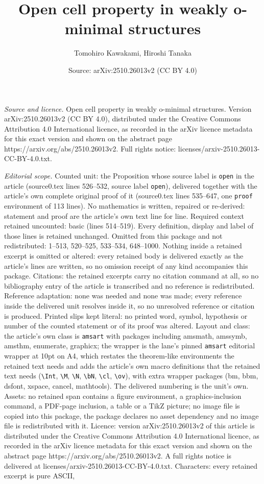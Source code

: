 \documentclass[10pt,a4paper]{amsart}
\title[Open cell property in weakly o-minimal structures]{Open cell property in weakly o-minimal structures}
\author{Tomohiro Kawakami, Hiroshi Tanaka}
\date{Source: arXiv:2510.26013v2 (CC BY 4.0)}
\begin{document}
\maketitle

\noindent\emph{Source and licence.} Open cell property in weakly o-minimal structures. Version arXiv:2510.26013v2 (CC BY 4.0), distributed under the Creative Commons Attribution 4.0 International licence, as recorded in the arXiv licence metadata for this exact version and shown on the abstract page https://arxiv.org/abs/2510.26013v2. Full rights notice: licenses/arxiv-2510.26013-CC-BY-4.0.txt.\par\smallskip

\noindent\textit{Editorial scope.} Counted unit: the Proposition whose source label is \texttt{open} in the article (source0.tex lines 526--532, source label \texttt{open}), delivered together with the article's own complete original proof of it (source0.tex lines 535--647, one \texttt{proof} environment of 113 lines). No mathematics is written, repaired or re-derived: statement and proof are the article's own text line for line. Required context retained uncounted: basic (lines 514--519). Every definition, display and label of those lines is retained unchanged. Omitted from this package and not redistributed: 1--513, 520--525, 533--534, 648--1000. Nothing inside a retained excerpt is omitted or altered: every retained body is delivered exactly as the article's lines are written, so no omission receipt of any kind accompanies this package. Citations: the retained excerpts carry no citation command at all, so no bibliography entry of the article is transcribed and no reference is redistributed. Reference adaptation: none was needed and none was made; every reference inside the delivered unit resolves inside it, so no unresolved reference or citation is produced. Printed slips kept literal: no printed word, symbol, hypothesis or number of the counted statement or of its proof was altered. Layout and class: the article's own class is \texttt{amsart} with packages including amsmath, amssymb, amsthm, enumerate, graphicx; the wrapper is the lane's pinned \texttt{amsart} editorial wrapper at 10pt on A4, which restates the theorem-like environments the retained text needs and adds the article's own macro definitions that the retained text needs (\texttt{\textbackslash Int}, \texttt{\textbackslash M}, \texttt{\textbackslash N}, \texttt{\textbackslash bN}, \texttt{\textbackslash cl}, \texttt{\textbackslash ov}), with extra wrapper packages (bm, bbm, dsfont, xspace, cancel, mathtools). The delivered numbering is the unit's own. Assets: no retained span contains a figure environment, a graphics-inclusion command, a PDF-page inclusion, a table or a TikZ picture; no image file is copied into this package, the package declares no asset dependency and no image file is redistributed with it. Licence: version arXiv:2510.26013v2 of this article is distributed under the Creative Commons Attribution 4.0 International licence, as recorded in the arXiv licence metadata for this exact version and shown on the abstract page https://arxiv.org/abs/2510.26013v2. A full rights notice is delivered at licenses/arxiv-2510.26013-CC-BY-4.0.txt. Characters: every retained excerpt is pure ASCII, 
\end{document}
